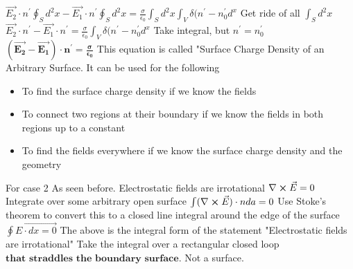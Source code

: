 \documentclass[12pt]{article}
\begin{document}
\newline $\vec{E_2} \cdot n^{'} \oint_S d^2x - \vec{E_1} \cdot n^{'} \oint_S d^2x = \frac{\sigma}{\epsilon_0} \int_S d^2x \int_V \delta (n^{'}-n_0^{'} d^x$
\newline Get ride of all $\int_S d^2x$
\newline $\vec{E_2} \cdot n^{'} - \vec{E_1} \cdot n^{'} = \frac{\sigma}{\epsilon_0} \int_V \delta (n^{'}-n_0^{'} d^x$
\newline Take integral, but $n^{'} = n_0^{'}$
\newline $\boxed{\boldsymbol{(\vec{E_2} - \vec{E_1}) \cdot n^{'} = \frac{\sigma}{\epsilon_0}}}$
\newline This equation is called "Surface Charge Density of an Arbitrary Surface. It can be used for the following
\begin{itemize}
    \item To find the surface charge density if we know the fields
    \item To connect two regions at their boundary if we know the fields in both regions up to a constant
    \item To find the fields everywhere if we know the surface charge density and the geometry
\end{itemize}
For case 2
\newline As seen before. Electrostatic fields are irrotational
\newline $\nabla \cross \vec{E} = 0$
\newline Integrate over some arbitrary open surface
\newline $\int (\nabla \cross \vec{E}) \cdot n da = 0$
\newline Use Stoke's theorem to convert this to a closed line integral around the edge of the surface
\newline $\oint \vec{E \cdot dx = 0}$
\newline The above is the integral form of the statement "Electrostatic fields are irrotational"
\newline Take the integral over a rectangular closed loop $\textbf{that straddles the boundary surface}$. Not a surface. 
\end{document}
